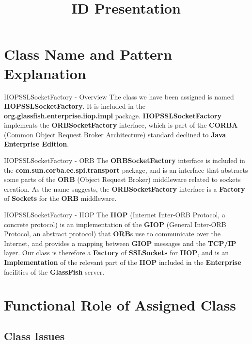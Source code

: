 \documentclass{../common/latex_classes/pdf_presentation}
\title{ID Presentation}
\begin{document}
	\titleToc{}
	\section{Class Name and Pattern Explanation}
	
	\begin{frame}{IIOPSSLSocketFactory - Overview}
		The class we have been assigned is named \textbf{IIOPSSLSocketFactory}.
		It is included in the \textbf{org.glassfish.enterprise.iiop.impl} package.
		\textbf{IIOPSSLSocketFactory} implements the \textbf{ORBSocketFactory} interface, which is part of the \textbf{CORBA} (Common Object Request Broker Architecture) standard declined to \textbf{Java Enterprise Edition}.
	\end{frame}
	
	\begin{frame}{IIOPSSLSocketFactory - ORB}
		The \textbf{ORBSocketFactory} interface is included in the \textbf{com.sun.corba.ee.spi.transport} package, and is an interface that abstracts some parts of the \textbf{ORB} (Object Request Broker) middleware related to sockets creation.
		As the name suggests, the \textbf{ORBSocketFactory} interface is a \textbf{Factory} of \textbf{Sockets} for the \textbf{ORB} middleware.
	\end{frame}
	
	\begin{frame}{IIOPSSLSocketFactory - IIOP}
		The \textbf{IIOP} (Internet Inter-ORB Protocol, a concrete protocol) is an implementation of the \textbf{GIOP} (General Inter-ORB Protocol, an abstract protocol) that \textbf{ORB}s use to communicate over the Internet, and provides a mapping between \textbf{GIOP} messages and the \textbf{TCP/IP} layer.
		Our class is therefore a \textbf{Factory} of \textbf{SSLSockets} for \textbf{IIOP}, and is an \textbf{Implementation} of the relevant part of the \textbf{IIOP} included in the \textbf{Enterprise} facilities of the \textbf{GlassFish} server.
	\end{frame}
	
	\section{Functional Role of Assigned Class}
	
	\subsection{Class Issues}
	
\end{document}
